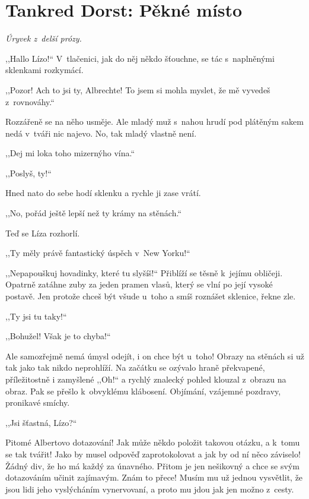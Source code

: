 \pagebreak

\section{Tankred Dorst: Pěkné místo}

\noindent
\textit{Úryvek z~delší prózy.}

\medskip

,,Hallo Lízo!`` V~tlačenici, jak do něj někdo šťouchne, se tác s~naplněnými sklenkami rozkymácí.

,,Pozor! Ach to jsi ty, Albrechte! To jsem si mohla myslet, že mě vyvedeš z~rovnováhy.``

Rozzářeně se na něho usměje. Ale mladý muž s~nahou hrudí pod plátěným sakem nedá v~tváři nic najevo. No, tak mladý vlastně není.

,,Dej mi loka toho mizernýho vína.``

,,Poslyš, ty!``

Hned nato do sebe hodí sklenku a rychle ji zase vrátí.

,,No, pořád ještě lepší než ty krámy na stěnách.``

Teď se Líza rozhorlí.

,,Ty měly právě fantastický úspěch v~New Yorku!``

,,Nepapouškuj hovadinky, které tu slyšíš!`` Přiblíží se těsně k~jejímu obličeji. Opatrně zatáhne zuby za jeden pramen vlasů, který se vlní po její vysoké postavě. Jen protože chceš být všude u~toho a smíš roznášet sklenice, řekne zle.

,,Ty jsi tu taky!``

,,Bohužel! Však je to chyba!``

Ale samozřejmě nemá úmysl odejít, i on chce být u~toho! Obrazy na stěnách si už tak jako tak nikdo neprohlíží. Na začátku se ozývalo hraně překvapené, příležitostně i zamyšlené ,,Oh!`` a rychlý znalecký pohled klouzal z~obrazu na obraz. Pak se přešlo k~obvyklému klábosení. Objímání, vzájemné pozdravy, pronikavé smíchy.

,,Jsi šťastná, Lízo?``

Pitomé Albertovo dotazování! Jak může někdo položit takovou otázku, a k~tomu se tak tvářit! Jako by musel odpověď zaprotokolovat a jak by od ní něco záviselo! Žádný div, že ho má každý za únavného. Přitom je jen nešikovný a chce se svým dotazováním učinit zajímavým. Znám to přece! Musím mu už jednou vysvětlit, že jsou lidi jeho vyslýcháním vynervovaní, a proto mu jdou jak jen možno z~cesty.

